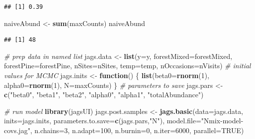 \documentclass[
]{article}
\newenvironment{Shaded}{\begin{snugshade}}{\end{snugshade}}
\newcommand{\AttributeTok}[1]{\textcolor[rgb]{0.13,0.29,0.53}{#1}}
\newcommand{\CommentTok}[1]{\textcolor[rgb]{0.56,0.35,0.01}{\textit{#1}}}
\newcommand{\ConstantTok}[1]{\textcolor[rgb]{0.56,0.35,0.01}{#1}}
\newcommand{\ControlFlowTok}[1]{\textcolor[rgb]{0.13,0.29,0.53}{\textbf{#1}}}
\newcommand{\DecValTok}[1]{\textcolor[rgb]{0.00,0.00,0.81}{#1}}
\newcommand{\FunctionTok}[1]{\textcolor[rgb]{0.13,0.29,0.53}{\textbf{#1}}}
\newcommand{\NormalTok}[1]{#1}
\newcommand{\OtherTok}[1]{\textcolor[rgb]{0.56,0.35,0.01}{#1}}
\newcommand{\StringTok}[1]{\textcolor[rgb]{0.31,0.60,0.02}{#1}}
\begin{document}
\begin{verbatim}
## [1] 0.39
\end{verbatim}

\begin{Shaded}
\begin{Highlighting}[]
\NormalTok{naiveAbund }\OtherTok{\textless{}{-}} \FunctionTok{sum}\NormalTok{(maxCounts)}
\NormalTok{naiveAbund}
\end{Highlighting}
\end{Shaded}

\begin{verbatim}
## [1] 48
\end{verbatim}

\begin{Shaded}
\begin{Highlighting}[]
\CommentTok{\# prep data in named list}
\NormalTok{jags.data }\OtherTok{\textless{}{-}} \FunctionTok{list}\NormalTok{(}\AttributeTok{y=}\NormalTok{y,}
                  \AttributeTok{forestMixed=}\NormalTok{forestMixed,}
                  \AttributeTok{forestPine=}\NormalTok{forestPine,}
                  \AttributeTok{nSites=}\NormalTok{nSites, }
                  \AttributeTok{temp=}\NormalTok{temp,}
                  \AttributeTok{nOccasions=}\NormalTok{nVisits)}
\CommentTok{\# initial values for MCMC}
\NormalTok{jags.inits }\OtherTok{\textless{}{-}} \ControlFlowTok{function}\NormalTok{() \{}
    \FunctionTok{list}\NormalTok{(}\AttributeTok{beta0=}\FunctionTok{rnorm}\NormalTok{(}\DecValTok{1}\NormalTok{), }\AttributeTok{alpha0=}\FunctionTok{rnorm}\NormalTok{(}\DecValTok{1}\NormalTok{), }\AttributeTok{N=}\NormalTok{maxCounts)}
\NormalTok{\}}
\CommentTok{\# parameters to save}
\NormalTok{jags.pars }\OtherTok{\textless{}{-}} \FunctionTok{c}\NormalTok{(}\StringTok{"beta0"}\NormalTok{, }\StringTok{"beta1"}\NormalTok{, }\StringTok{"beta2"}\NormalTok{,}
               \StringTok{"alpha0"}\NormalTok{, }\StringTok{"alpha1"}\NormalTok{, }\StringTok{"totalAbundance"}\NormalTok{)}

\CommentTok{\# run model}
\FunctionTok{library}\NormalTok{(jagsUI)}
\NormalTok{jags.post.samples }\OtherTok{\textless{}{-}} \FunctionTok{jags.basic}\NormalTok{(}\AttributeTok{data=}\NormalTok{jags.data, }
                                \AttributeTok{inits=}\NormalTok{jags.inits,}
                                \AttributeTok{parameters.to.save=}\FunctionTok{c}\NormalTok{(jags.pars,}\StringTok{"N"}\NormalTok{), }
                                \AttributeTok{model.file=}\StringTok{"Nmix{-}model{-}covs.jag"}\NormalTok{,}
                                \AttributeTok{n.chains=}\DecValTok{3}\NormalTok{,}
                                \AttributeTok{n.adapt=}\DecValTok{100}\NormalTok{, }
                                \AttributeTok{n.burnin=}\DecValTok{0}\NormalTok{,}
                                \AttributeTok{n.iter=}\DecValTok{6000}\NormalTok{,}
                                \AttributeTok{parallel=}\ConstantTok{TRUE}\NormalTok{)}
\end{Highlighting}
\end{Shaded}
\end{document}
